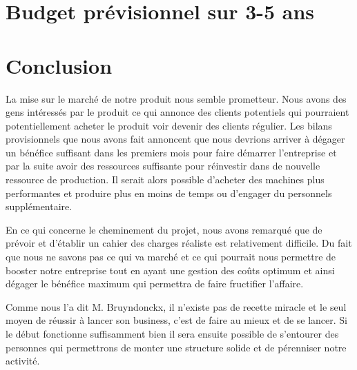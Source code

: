 \documentclass[12pt]{article}
\begin{document}
\section{Budget prévisionnel sur 3-5 ans}

\section{Conclusion}
La mise sur le marché de notre produit nous semble prometteur. Nous avons des gens intéressés par le produit ce qui annonce des clients potentiels qui pourraient potentiellement acheter le produit voir devenir des clients régulier. Les bilans provisionnels que nous avons fait annoncent que nous devrions arriver à dégager un bénéfice suffisant dans les premiers mois pour faire démarrer l'entreprise et par la suite avoir des ressources suffisante pour réinvestir dans de nouvelle ressource de production. Il serait alors possible d'acheter des machines plus performantes et produire plus en moins de temps ou d'engager du personnels supplémentaire.

En ce qui concerne le cheminement du projet, nous avons remarqué que de prévoir et d'établir un cahier des charges réaliste est relativement difficile. Du fait que nous ne savons pas ce qui va marché et ce qui pourrait nous permettre de booster notre entreprise tout en ayant une gestion des coûts optimum et ainsi dégager le bénéfice maximum qui permettra de faire fructifier l'affaire.

Comme nous l'a dit M. Bruyndonckx, il n'existe pas de recette miracle et le seul moyen de réussir à lancer son business, c'est de faire au mieux et de se lancer. Si le début fonctionne suffisamment bien il sera ensuite possible de s'entourer des personnes qui permettrons de monter une structure solide et de pérenniser notre activité.



\end{document}
